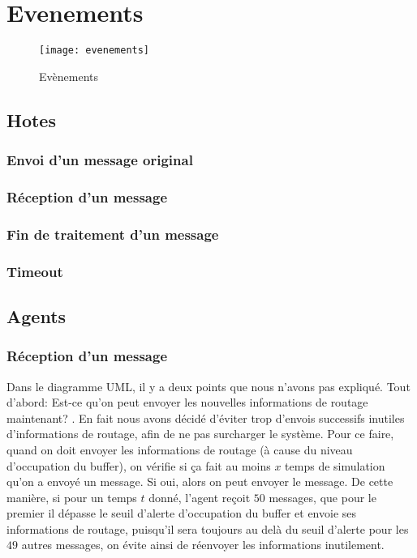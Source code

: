 \documentclass[a4paper,11pt]{article}
\begin{document}

\tableofcontents %
\pagebreak
\listoffigures %
\pagebreak


\section{Evenements}

\begin{figure}[h!t]
  \centering
    \texttt{[image: evenements]}
  \caption{Evènements}
  \label{fig:evenements}
\end{figure}

\subsection{Hotes}
\subsubsection{Envoi d'un message original}
\subsubsection{Réception d'un message}
\subsubsection{Fin de traitement d'un message}
\subsubsection{Timeout}

\subsection{Agents}
\subsubsection{Réception d'un message}\label{evt-agent-reception-message}
Dans le diagramme UML, il y a deux points que nous n'avons pas expliqué. Tout d'abord: \og Est-ce qu'on peut envoyer les nouvelles informations de routage maintenant? \fg. En fait nous avons décidé d'éviter trop d'envois successifs inutiles d'informations de routage, afin de ne pas surcharger le système. Pour ce faire, quand on doit envoyer les informations de routage (à cause du niveau d'occupation du buffer), on vérifie si ça fait au moins $x$ temps de simulation qu'on a envoyé un message. Si oui, alors on peut envoyer le message. De cette manière, si pour un temps $t$ donné, l'agent reçoit $50$ messages, que pour le premier il dépasse le seuil d'alerte d'occupation du buffer et envoie ses informations de routage, puisqu'il sera toujours au delà du seuil d'alerte pour les $49$ autres messages, on évite ainsi de réenvoyer les informations inutilement.
\end{document}
